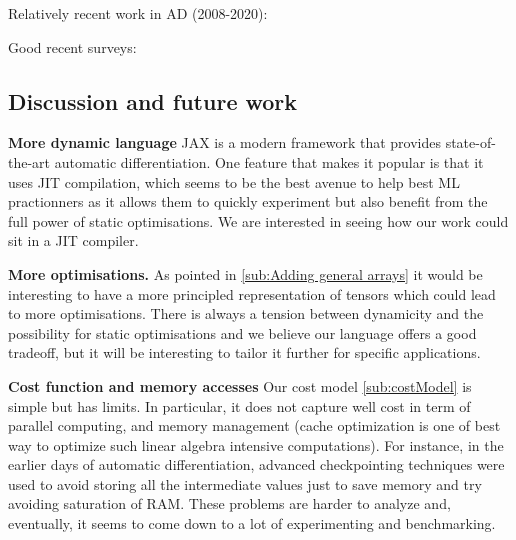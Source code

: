 Relatively recent work in AD (2008-2020):
\cite{mak2020differential,elliotthigher,vytiniotis2019differentiable,innes2018don,baydin2017automatic,huot2020correctness,gallagher-sdg,manzyuk2012confusion,wang2018demystifying,beck1994if,wang2018backpropagation,betancourt2018geometric,elliott2018simple,carpenter2015stan,paszke2017automatic,shaikhha2019efficient,innes2019zygote,griewank2008evaluating,kucukelbir2017automatic,brunel2019backpropagation,barthe2020versatility,abadi2019simple,cockett2019reverse,van2018automatic,hascoet2013tapenade,abadi2016tensorflow,pearlmutter2008reverse,bergstra2010theano,fong2019backprop,ehrhard2003differential,agrawal2019tensorflow,bettencourt2019taylor,cruttwell2017cartesian,manzyuk2012simply,laue2018computing,bernstein2020differentiating}

Good recent surveys: \cite{van2018automatic,baydin2017automatic}

\subsection{Discussion and future work} %
\label{sub:discussion_and_future_work}

\noindent \textbf{More dynamic language}
JAX \cite{bradbury2020jax,frostig2018compiling} is a modern framework that provides state-of-the-art automatic differentiation. 
One feature that makes it popular is that it uses JIT compilation, 
which seems to be the best avenue to help best ML practionners as it allows them 
to quickly experiment but also benefit from the full power of static optimisations.
We are interested in seeing how our work could sit in a JIT compiler. 

\noindent \textbf{More optimisations.}
As pointed in \ref{sub:Adding general arrays} it would be interesting to have a more principled representation 
of tensors which could lead to more optimisations. 
There is always a tension between dynamicity and the possibility for static optimisations 
and we believe our language offers a good tradeoff, but it will be interesting to tailor it 
further for specific applications.

\noindent \textbf{Cost function and memory accesses}
Our cost model \ref{sub:costModel} is simple but has limits. 
In particular, it does not capture well cost in term of
parallel computing, and memory management (cache optimization is one of best way to optimize such linear algebra intensive computations).
For instance, in the earlier days of automatic differentiation, 
advanced checkpointing techniques were used to avoid storing all the intermediate values just to save memory 
and try avoiding saturation of RAM. 
These problems are harder to analyze and, eventually, it seems to come down to a lot of experimenting and benchmarking.

